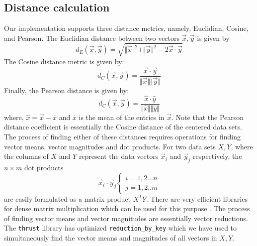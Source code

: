 \documentclass[10pt]{article}
\begin{document}
\subsection*{Distance calculation}
Our implementation supports three distance metrics, namely, Euclidian, Cosine, and Pearson. The Euclidian distance between two vectors $\vec{x},\vec{y}$ is given by
\begin{equation*}
d_E(\vec{x},\vec{y}) = \sqrt{\Vert \vec{x} \Vert^2+\Vert \vec{y} \Vert^2-2\vec{x} \cdot \vec{y}} 
\end{equation*}
The Cosine distance metric is given by: 
\begin{equation*}
d_C(\vec{x},\vec{y}) = \frac{\vec{x} \cdot \vec{y}}{ \Vert \vec{x} \Vert \Vert \vec{y} \Vert}
\end{equation*}
Finally, the Pearson distance is given by:
\begin{equation*}
d_C(\vec{x},\vec{y}) = \frac{\hat{x} \cdot \hat{y}}{ \Vert \hat{x} \Vert\Vert \hat{y} \Vert}
\end{equation*}
where, $\hat{x} = \vec{x}-\bar{x}$ and $\bar{x}$ is the mean of the entries in $\vec{x}$. Note that the Pearson distance coefficient is essentially the Cosine distance of the centered data sets.\\

The process of finding either of these distances requires operations for finding vector means, vector magnitudes and dot products. For two data sets $X, Y$, where the columns of $X$ and $Y$ represent the data vectors $\vec{x}_i$ and $\vec{y}_j$ respectively, the $n\times m$ dot products 
\begin{equation*}
\vec{x}_i \cdot \vec{y}_j  \left \{ \begin{array}{c} i=1,2...n \\ j = 1,2..m \end{array} \right.
\end{equation*}
are easily formulated as a matrix product $X^TY$. There are very efficient libraries for dense matrix multiplication which can be used for this purpose \cite{Volkov:2008}. The process of finding vector means and vector magnitudes are essentially vector reductions. The \texttt{thrust} library has optimized \texttt{reduction\_by\_key} which we have used to simultaneously find the vector means and magnitudes of all vectors in $X,Y$.\\
\end{document}
